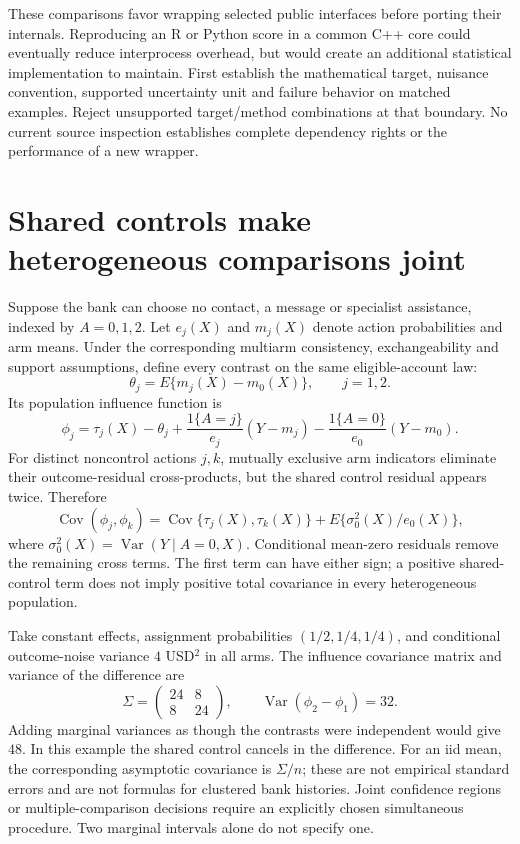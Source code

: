 These comparisons favor wrapping selected public interfaces before porting
their internals. Reproducing an R or Python score in a common C++ core could
eventually reduce interprocess overhead, but would create an additional
statistical implementation to maintain. First establish the mathematical
target, nuisance convention, supported uncertainty unit and failure behavior
on matched examples. Reject unsupported target/method combinations at that
boundary. No current source inspection establishes complete dependency rights
or the performance of a new wrapper.\citep{exec17_s4_design}

\section{Shared controls make heterogeneous comparisons joint}
\label{exec17:s4-joint}

Suppose the bank can choose no contact, a message or specialist assistance,
indexed by $A=0,1,2$. Let $e_j(X)$ and $m_j(X)$ denote action probabilities
and arm means. Under the corresponding multiarm consistency, exchangeability
and support assumptions, define every contrast on the same eligible-account
law:
\[
 \theta_j=E\{m_j(X)-m_0(X)\},\qquad j=1,2.
\]
Its population influence function is
\[
 \phi_j=\tau_j(X)-\theta_j+
       \frac{1\{A=j\}}{e_j}(Y-m_j)
       -\frac{1\{A=0\}}{e_0}(Y-m_0).
\]
For distinct noncontrol actions $j,k$, mutually exclusive arm indicators
eliminate their outcome-residual cross-products, but the shared control
residual appears twice. Therefore
\begin{equation}
 \operatorname{Cov}(\phi_j,\phi_k)=
 \operatorname{Cov}\{\tau_j(X),\tau_k(X)\}
       +E\{\sigma_0^2(X)/e_0(X)\},
 \label{exec17:s4-shared-control}
\end{equation}
where $\sigma_0^2(X)=\operatorname{Var}(Y\mid A=0,X)$.
Conditional mean-zero residuals remove the remaining cross terms. The first
term can have either sign; a positive shared-control term does not imply
positive total covariance in every heterogeneous population.

Take constant effects, assignment probabilities $(1/2,1/4,1/4)$, and
conditional outcome-noise variance $4$ USD$^2$ in all arms. The influence
covariance matrix and variance of the difference are
\[
 \Sigma=\begin{pmatrix}24&8\\8&24\end{pmatrix},\qquad
 \operatorname{Var}(\phi_2-\phi_1)=32.
\]
Adding marginal variances as though the contrasts were independent would give
$48$. In this example the shared control cancels in the difference. For an
iid mean, the corresponding asymptotic covariance is $\Sigma/n$; these are
not empirical standard errors and are not formulas for clustered bank
histories. Joint confidence regions or multiple-comparison decisions require
an explicitly chosen simultaneous procedure. Two marginal intervals alone
do not specify one.\citep{exec17_s4_math}

